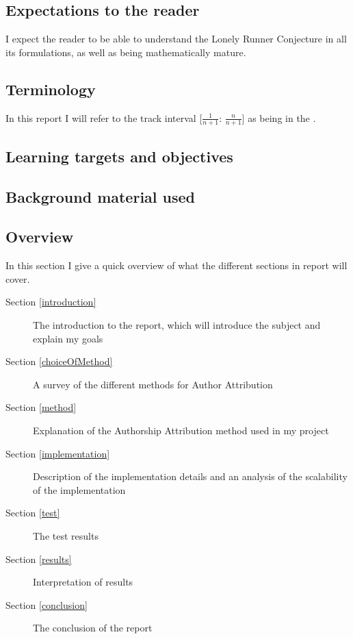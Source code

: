 \subsection{Expectations to the reader}
\label{expectations}
I expect the reader to be able to understand the Lonely Runner Conjecture in all its formulations, as well as being mathematically mature.

\subsection{Terminology}
\label{Termonolgy}
In this report I will refer to the track interval [$\frac{1}{n + 1}$: $\frac{n}{n+1}$] as being in the \zone.

\subsection{Learning targets and objectives}
\label{learning}

\subsection{Background material used}
\label{background}

\subsection{Overview}

In this section I give a quick overview of what the different sections in report will cover.
\begin{description}
\item[Section \ref{introduction}] The introduction to the report, which will introduce the subject and explain my goals
\item[Section \ref{choiceOfMethod}] A survey of the different methods for Author Attribution  
\item[Section \ref{method}] Explanation of the Authorship Attribution method used in my project
\item[Section \ref{implementation}] Description of the implementation details and an analysis of the scalability of the implementation
\item[Section \ref{test}] The test results
\item[Section \ref{results}] Interpretation of results
\item[Section \ref{conclusion}] The conclusion of the report  
\end{description}
